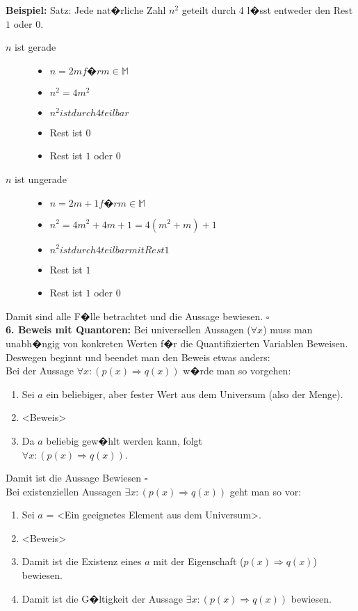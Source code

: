 \textbf{Beispiel:}
Satz: \glqq Jede nat�rliche Zahl $n^2$ geteilt durch 4 l�sst entweder den Rest $1$ oder $0$\grqq .
\begin{description}
  \item[$n$ ist gerade]\hfill
  \begin{itemize}
    \item $n = 2m f�r m \in \mathbb{M}$
    \item $n^2 = 4m^2$
    \item $n^2 ist durch 4 teilbar$
    \item Rest ist $0$
    \item Rest ist $1$ oder $0$
  \end{itemize}
  \item[$n$ ist ungerade]\hfill
  \begin{itemize}
    \item $n = 2m + 1 f�r m \in \mathbb{M}$
    \item $n^2 = 4m^2 + 4m + 1 = 4(m^2 + m) + 1$
    \item $n^2 ist durch 4 teilbar mit Rest 1$
    \item Rest ist $1$
    \item Rest ist $1$ oder $0$
  \end{itemize}
\end{description}
Damit sind alle F�lle betrachtet und die Aussage bewiesen. $\square$
\\
\textbf{6. Beweis mit Quantoren:} Bei universellen Aussagen ($\forall x$) muss man unabh�ngig von konkreten Werten f�r die Quantifizierten Variablen Beweisen. Deswegen beginnt und beendet man den Beweis etwas anders:\\
Bei der Aussage $\forall x : (p(x) \Rightarrow q(x))$ w�rde man so vorgehen:
\begin{enumerate}
  \item Sei $a$ ein beliebiger, aber fester Wert aus dem Universum (also der Menge).
  \item <Beweis>
  \item Da $a$ beliebig gew�hlt werden kann, folgt \\$\forall x : (p(x) \Rightarrow q(x))$.
\end{enumerate}
Damit ist die Aussage Bewiesen $\square$
\\
Bei existenziellen Aussagen $\exists x : (p(x) \Rightarrow q(x))$
geht man so vor:
\begin{enumerate}
  \item Sei $a$ = <Ein geeignetes Element aus dem Universum>.
  \item <Beweis>
  \item Damit ist die Existenz eines $a$ mit der Eigenschaft ($p(x) \Rightarrow q(x)$) bewiesen. 
  \item Damit ist die G�ltigkeit der Aussage $\exists x : (p(x) \Rightarrow q(x))$ bewiesen.
\end{enumerate}
